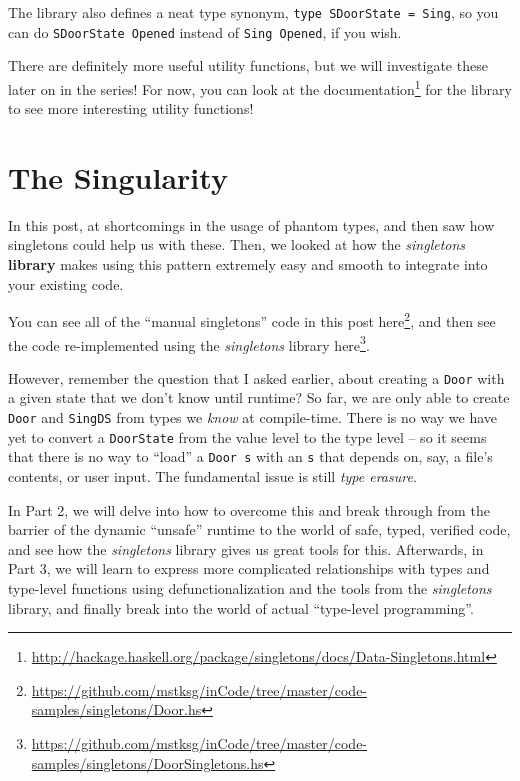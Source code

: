 \documentclass[]{article}
\renewcommand{\href}[2]{#2\footnote{\url{#1}}}
\begin{document}
The library also defines a neat type synonym,
\texttt{type\ SDoorState\ =\ Sing}, so you can do
\texttt{SDoorState\ \textquotesingle{}Opened} instead of
\texttt{Sing\ \textquotesingle{}Opened}, if you wish.

There are definitely more useful utility functions, but we will investigate
these later on in the series! For now, you can look at the
\href{http://hackage.haskell.org/package/singletons/docs/Data-Singletons.html}{documentation}
for the library to see more interesting utility functions!

\hypertarget{the-singularity}{%
\section{The Singularity}\label{the-singularity}}

In this post, at shortcomings in the usage of phantom types, and then saw how
singletons could help us with these. Then, we looked at how the
\emph{singletons} \textbf{library} makes using this pattern extremely easy and
smooth to integrate into your existing code.

You can see all of the ``manual singletons'' code in this post
\href{https://github.com/mstksg/inCode/tree/master/code-samples/singletons/Door.hs}{here},
and then see the code re-implemented using the \emph{singletons} library
\href{https://github.com/mstksg/inCode/tree/master/code-samples/singletons/DoorSingletons.hs}{here}.

However, remember the question that I asked earlier, about creating a
\texttt{Door} with a given state that we don't know until runtime? So far, we
are only able to create \texttt{Door} and \texttt{SingDS} from types we
\emph{know} at compile-time. There is no way we have yet to convert a
\texttt{DoorState} from the value level to the type level -- so it seems that
there is no way to ``load'' a \texttt{Door\ s} with an \texttt{s} that depends
on, say, a file's contents, or user input. The fundamental issue is still
\emph{type erasure}.

In Part 2, we will delve into how to overcome this and break through from the
barrier of the dynamic ``unsafe'' runtime to the world of safe, typed, verified
code, and see how the \emph{singletons} library gives us great tools for this.
Afterwards, in Part 3, we will learn to express more complicated relationships
with types and type-level functions using defunctionalization and the tools from
the \emph{singletons} library, and finally break into the world of actual
``type-level programming''.
\end{document}
